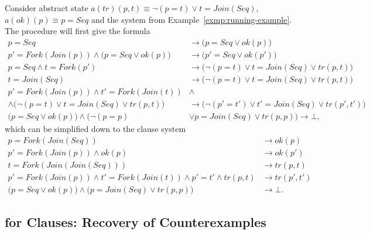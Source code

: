 \begin{example}
Consider abstract state $a(tr)(p, t) \equiv \neg(p = t) \lor t = Join(Seq)$, $a(ok)(p) \equiv p = Seq$ and the system from Example~\ref{exmp:running-example}. The procedure \substituteLemmas{} will first give the formula
\begin{align*}
  p = Seq &\rightarrow\big(p = Seq \lor ok(p)\big)&\\
  p' = Fork(Join(p)) \land \big(p = Seq \lor ok(p)\big) &\rightarrow\big(p' = Seq \lor ok(p')\big)&\\
  p = Seq \land t = Fork(p') &\rightarrow\big(\neg(p = t) \lor t = Join(Seq) \lor tr(p, t)\big)&\\
  t = Join(Seq) &\rightarrow\big(\neg(p = t) \lor t = Join(Seq) \lor tr(p, t)\big)&\\
  p' = Fork(Join(p)) \land t' = Fork(Join(t)) &\land&\\
  \land\big(\neg(p = t) \lor t = Join(Seq) \lor tr(p, t)\big)
  &\rightarrow\big(\neg(p' = t') \lor t' = Join(Seq) \lor tr(p', t')\big)&\\
  \big(p = Seq \lor ok(p)\big) \land \big(\neg(p = p)  &\lor p = Join(Seq) \lor tr(p, p)\big) \rightarrow \bot,
  \end{align*}
which can be simplified down to the clause system
\begin{align*}
  p = Fork(Join(Seq)) &\rightarrow ok(p)\\
  p' = Fork(Join(p)) \land ok(p) &\rightarrow ok(p')\\
  t = Fork(Join(Join(Seq))) &\rightarrow tr(p, t)\\
  p' = Fork(Join(p)) \land t' = Fork(Join(t)) \land p' = t'\land tr(p, t) &\rightarrow tr(p', t')\\
  \big(p = Seq \lor ok(p)\big) \land \big(p = Join(Seq) \lor tr(p, p)\big) &\rightarrow \bot.
  \end{align*}
\end{example}

\subsection{\ourCEGAR{} for Clauses: Recovery of Counterexamples}\label{sec:recover-cex}

